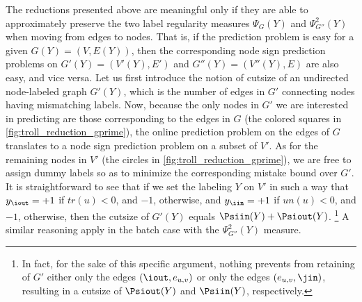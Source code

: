 The reductions presented above are meaningful only if they are able to approximately preserve the
two label regularity measures $\Psi_G(Y)$ and $\Psi^2_{G''}(Y)$ when moving from edges to nodes.
That is, if the \esp{} prediction problem is
easy for a given $G(Y) = (V,E(Y))$, then the corresponding node sign prediction problems on $G'(Y)
= (V'(Y),E')$ and $G''(Y) = (V''(Y),E)$ are also easy, and vice versa.
Let us first introduce the notion of cutsize of an undirected node-labeled graph $G'(Y)$, which is
the number of edges in $G'$ connecting nodes having mismatching labels.
  Now, because the only nodes in $G'$ we are
  interested in predicting are those corresponding to the edges in $G$ (the colored squares in
  \autoref{fig:troll_reduction_gprime}), the online prediction problem on the edges of $G$ translates to a node
  sign prediction problem on a subset of $V'$. As for the remaining nodes in $V'$ (the circles in
  \autoref{fig:troll_reduction_gprime}), we are free to assign dummy labels so as to minimize the corresponding mistake
  bound over $G'$. It is straightforward to see that if we set the labeling $Y$ on $V'$ in such a
  way that $y_{\iout} = +1$ if $tr(u) < 0$, and $-1$, otherwise, and $y_{\iin} = +1$ if $un(u) <
  0$, and $-1$, otherwise, then the cutsize of $G'(Y)$ equals  $\Psiin(Y) + \Psiout(Y)$.%
  \footnote{In fact, for the sake of
  this specific argument, nothing prevents from retaining of $G'$ either only the edges
  $(\iout,e_{u,v})$ or only the edges $(e_{u,v},\jin)$, resulting in a cutsize of $\Psiout(Y)$ and
  $\Psiin(Y)$, respectively.}
  A similar reasoning apply in the batch case with the $\Psi^2_{G''}(Y)$ measure.
